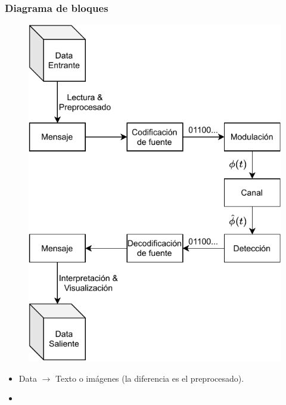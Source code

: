 \documentclass[aspectratio=169]{beamer}
\begin{document}
\begin{frame}

\frametitle{Diagrama de bloques}

\begin{figure}[H]
	\centering
	\includegraphics[width=.75\linewidth]{p2-blocks.pdf}
\end{figure}

\begin{itemize}
	\item Data $\rightarrow$ Texto o imágenes (la diferencia es el preprocesado).
	\item 
\end{itemize}

\end{frame}

\end{document}
